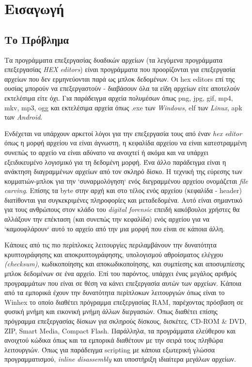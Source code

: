 \section{Εισαγωγή}
\subsection{Το Πρόβλημα}
Τα προγράμματα επεξεργασίας δυαδικών αρχείων (τα λεγόμενα προγράμματα επεξεργασίας \emph{HEX editors}) είναι προγράμματα που προορίζονται για επεξεργασία αρχείων που δεν ερμηνεύονται παρά ως μπλοκ δεδομένων.
Οι hex editors επί της ουσίας μπορούν να επεξεργαστούν - διαβάσουν όλα τα είδη αρχείων είτε αποτελούν εκτελέσιμα είτε όχι. Για παράδειγμα αρχεία πολυμέσων όπως png, jpg, gif, mp4, mkv, mp3, ogg και εκτελέσιμα αρχεία όπως .exe των \emph{Windows}, elf των \emph{Linux}, apk των \emph{Android}.

Ενδέχεται να υπάρχουν αρκετοί λόγοι για την επεξεργασία τους από έναν \emph{hex editor} όπως η μορφή αρχείου να είναι άγνωστη, η κεφαλίδα αρχείου να είναι κατεστραμμένη συνεπώς το αρχείο να είναι αδύνατο να ανοιχτεί ή ακόμα και να υπάρχει εξειδικευμένο λογισμικό για τη δεδομένη μορφή.
Ένα άλλο παράδειγμα είναι η ανάκτηση διαγραμμένων αρχείων από τον σκληρό δίσκο. Η τεχνική της εύρεσης των κομματιών-μπλοκ για την `συναρμολόγηση` ενός διεγραμμένου αρχείου ονομάζεται \emph{file carving}.
Επίσης τα byte στην αρχή και στο τέλος ενός αρχείου (κεφαλίδα - header) διατίθονται για συγκεκριμένες πληροφορίες και μεταδεδομένα.
Αυτό είναι σημαντικό για τους ανθρώπους στον κλάδο του \emph{digital forensic} επειδή κακόβουλοι χρήστες θα αλλάξουν την επέκταση (και συνεπώς την κεφαλίδα) ενός αρχείου για να `καμουφλάρουν` αυτό το αρχείο από την μια μορφή που είναι σε κάποια άλλη.

Κάποιες από τις πιο περίπλοκες λειτουργίες περιλαμβάνουν την δυνατότητα κρυπτογράφησης και αποκρυπτογράφησης, υπολογισμού αθροίσματος ελέγχου \emph{(checksum)}, κωδικοποίησης και αποκωδικοποίησης, και συμπίεσης και αποσυμπίεσης μπλοκ δεδομένων σε ένα αρχείο.
Επί του παρόντος, υπάρχει ένας μεγάλος αριθμός προγραμμάτων που είναι σε θέση να κάνει επεξεργασία αυτών των αρχείων.
Κάποια από τα εμπορικά έχουν την δυνατότητα περίπλοκων λειτουργιών όπως είναι το Winhex το οποίο διαθέτει πρόγραμμα επεξεργασίας RAM, παρέχοντας πρόσβαση σε φυσική μνήμη και εικονική μνήμη άλλων διεργασιών.
Όπως διαθέτει επίσης πρόγραμμα επεξεργασίας δίσκων για σκληρούς δίσκους, δισκέτες, CD-ROM & DVD, ZIP, Smart Media, Compact Flash.
Παράλληλα, τα προγράμματα ελεύθερου και ανοιχτού κώδικα όπως και τα εμπορικά διαθέτουν με την σειρά τους πληθώρα λειτουργιών.
Όπως για παράδειγμα scripting με κάποια εξωτερική γλώσσα προγραμματισμού, \emph{inline disassembly} και υποστήριξη ιδιαίτερα μεγάλων αρχείων.

